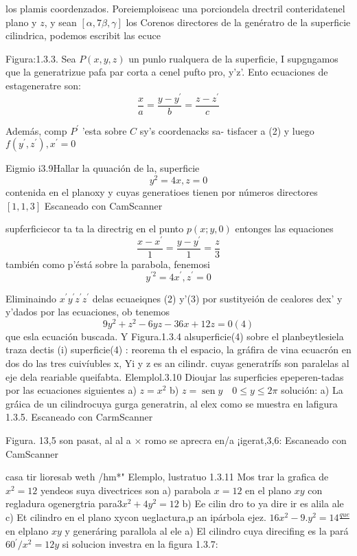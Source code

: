 los plamis coordenzados. Poreiemploiseac una porciondela drectril conteridatenel plano y $z$, y sean $[\alpha, 7 \beta, \gamma]$ los Corenos directores de la genératro de la superficie cilindrica, podemos escribit las ecuce

Figura:1.3.3.
Sea $P(x, y, z)$ un punlo rualquera de la superficie, I supgngamos que la generatrizue pafa par corta a cenel pufto pro, y'z'. Ento
ecuaciones de estageneratre son:
$$
\frac{x}{a}=\frac{y-y^{\prime}}{b}=\frac{z-z^{\prime}}{c}
$$

Además, comp $P^{\prime}$ 'esta sobre $C$ sy's coordenacks sa- tisfacer a (2) y luego $f\left(y^{\prime}, z^{\prime}\right), x^{\prime}=0$

Eigmio i3.9Hallar la quuación de la, superficie
$$
y^2=4 x, z=0
$$
contenida en el planoxy y cuyas generatioes tienen por números directores $[1,1,3]$
Escaneado con CamScanner




supferficiecor ta ta la directrig en el punto $p(x ; y, 0)$ entonges las equaciones
$$
\frac{x-x^{\prime}}{1}=\frac{y-y^{\prime}}{1}=\frac{z}{3}
$$
también como p'éstá sobre la parabola, fenemosi
$$
y^{\prime 2}=4 x^{\prime}, z^{\prime}=0
$$

Eliminaindo $x^{\prime} y^{\prime} z^{\prime} z^{\prime}$ delas ecuaeiqnes (2) y'(3) por sustityeión de cealores dex' y y'dados por las ecuaciones, ob tenemos
$$
9 y^2+z^2-6 y z-36 x+12 z=0(4)
$$
que esla ecuación buscada.
Y Figura.1.3.4
alsuperficie(4) sobre el planbeytlesiela traza dectis (i) superficie(4) :
reorema th el espacio, la gráfira de vina ecuacrón en dos do las tres cuivíubles x, Yi y z es an cilindr. cuyas generatrífs son paralelas al eje dela reariable queifabta.
Elemplol.3.10 Dioujar las superficies epeperen-tadas por las ecuaciones siguientes
a) $z=x^2$
b) $z=\operatorname{sen} y \quad 0 \leq y \leq 2 \pi$
solución:
a) La grá́ica de un cilindrocuya gurga generatrin, al elex como se muestra en lafigura 1.3.5.
Escaneado con CarmScanner




Figura. 13,5 son pasat, al al a $\times$ romo se aprecra en/a ¡igerat,3,6:
Escaneado con CamScanner




casa tir lioresab weth /hm*"
Elemplo, lustratuo 1.3.11 Mos trar la grafica de $x^2=12$ yendeos suya divectrices son a) parabola $x=12$ en el plano $x y$ con regladura ogenergtria para$3 x^2+4 y^2=12$ b) Ee cilin dro to ya dire ir es alila ale c) Et cilindro en el plano xycon ueglactura,p an ipárbola ejez. $16 x^2-9 . y^2=14 \frac{q u e}{}$ en elplano $x y$ y generáring parallola al ele
a) El cilindro cuya direcifing es la pará $60^{\prime} / x^2=12 y$ si solucion investra en la figura 1.3.7:

